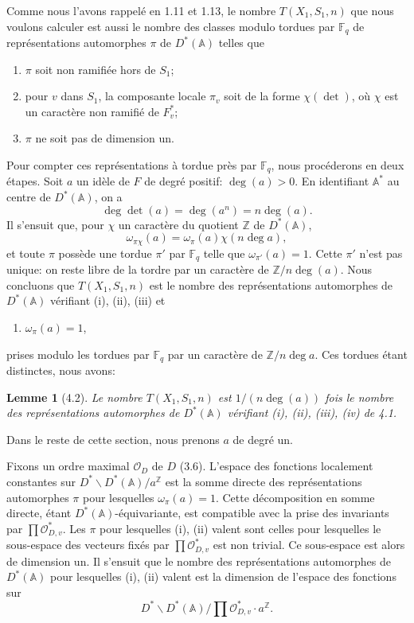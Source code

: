 \documentclass[10pt]{article}
\newcommand{\Fq}{\mathbb F_q}
\newcommand{\Z}{\mathbb Z}
\newcommand{\Adele}{\mathbb A}
\newcommand{\degm}{\operatorname{deg}}
\newcommand{\detm}{\operatorname{det}}
\newcommand{\OD}{\mathcal O_D}
\theoremstyle{deligne}
\newtheorem*{lemma*}{Lemme}
\newcommand{\heading}[1]{\vspace{0.7em}\noindent{\bfseries #1}\quad}
\begin{document}
\heading{4.1.} Comme nous l'avons rappelé en 1.11 et 1.13, le nombre $T(X_1,S_1,n)$ que nous voulons calculer est aussi le nombre des classes modulo tordues par $\Fq$ de représentations automorphes $\pi$ de $D^*(\Adele)$ telles que
\begin{enumerate}[label=(\roman*)]
\item $\pi$ soit non ramifiée hors de $S_1$;
\item pour $v$ dans $S_1$, la composante locale $\pi_v$ soit de la forme $\chi(\detm)$, où $\chi$ est un caractère non ramifié de $F_v^*$;
\item $\pi$ ne soit pas de dimension un.
\end{enumerate}
Pour compter ces représentations à tordue près par $\Fq$, nous procéderons en deux étapes. Soit $a$ un id\`ele de $F$ de degré positif: $\degm(a)>0$. En identifiant $\Adele^*$ au centre de $D^*(\Adele)$, on a
\[
\degm\detm(a)=\degm(a^n)=n\degm(a).
\]
Il s'ensuit que, pour $\chi$ un caractère du quotient $\Z$ de $D^*(\Adele)$,
\[
\omega_{\pi\chi}(a)=\omega_\pi(a)\chi(n\degm a),
\]
et toute $\pi$ possède une tordue $\pi'$ par $\Fq$ telle que $\omega_{\pi'}(a)=1$. Cette $\pi'$ n'est pas unique: on reste libre de la tordre par un caractère de $\Z/n\degm(a)$. Nous concluons que $T(X_1,S_1,n)$ est le nombre des représentations automorphes de $D^*(\Adele)$ vérifiant (i), (ii), (iii) et
\begin{enumerate}[label=(\roman*),resume]
\item $\omega_\pi(a)=1$,
\end{enumerate}
prises modulo les tordues par $\Fq$ par un caractère de $\Z/n\degm a$. Ces tordues étant distinctes, nous avons:

\begin{lemma*}[4.2]
Le nombre $T(X_1,S_1,n)$ est $1/(n\degm(a))$ fois le nombre des représentations automorphes de $D^*(\Adele)$ vérifiant (i), (ii), (iii), (iv) de 4.1.
\end{lemma*}

Dans le reste de cette section, nous prenons $a$ de degré un.

\heading{4.3.} Fixons un ordre maximal $\OD$ de $D$ (3.6). L'espace des fonctions localement constantes sur $D^*\backslash D^*(\Adele)/a^\Z$ est la somme directe des représentations automorphes $\pi$ pour lesquelles $\omega_\pi(a)=1$. Cette décomposition en somme directe, étant $D^*(\Adele)$-équivariante, est compatible avec la prise des invariants par $\prod\mathcal O_{D,v}^*$. Les $\pi$ pour lesquelles (i), (ii) valent sont celles pour lesquelles le sous-espace des vecteurs fixés par $\prod\mathcal O_{D,v}^*$ est non trivial. Ce sous-espace est alors de dimension un. Il s'ensuit que le nombre des représentations automorphes de $D^*(\Adele)$ pour lesquelles (i), (ii) valent est la dimension de l'espace des fonctions sur
\[
D^*\backslash D^*(\Adele)/\prod\mathcal O_{D,v}^*\cdot a^\Z .
\]
\end{document}
